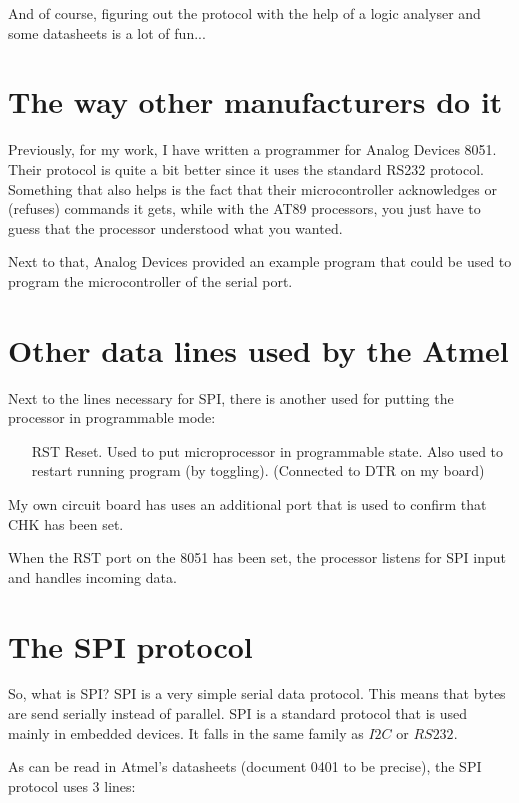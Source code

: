 \documentclass[a4paper]{article}
\begin{document}
And of course, figuring out the protocol with the help of a logic analyser and 
some datasheets is a lot of fun...

\section{The way other manufacturers do it}

Previously, for my work, I have written a programmer for Analog Devices
8051. Their protocol is quite a bit better since it uses the standard RS232
protocol. Something that also helps is the fact that their microcontroller 
acknowledges or (refuses) commands it gets, while with the AT89 processors, 
you just have to guess that the processor understood what you wanted.

Next to that, Analog Devices provided an example program that could be 
used to program the microcontroller of the serial port.

\section{Other data lines used by the Atmel}

Next to the lines necessary for SPI, there is another used for putting 
the processor in programmable mode:

\begin{itemize}
\item[RST] Reset. Used to put microprocessor in programmable state. Also used to restart running program (by toggling). (Connected to DTR on my board)
\end{itemize}

My own circuit board has uses an additional port that is used to confirm 
that CHK has been set.

When the RST port on the 8051 has been set, the processor listens for SPI 
input and handles incoming data.

\section{The SPI protocol}

So, what is SPI? SPI is a very simple serial data protocol. This means 
that bytes are send serially instead of parallel. SPI is a standard protocol 
that is used mainly in embedded devices. It falls in the same family as 
$I2C$ or $RS232$.

As can be read in Atmel's datasheets (document 0401 to be precise), 
the SPI protocol uses 3 lines:
\end{document}
